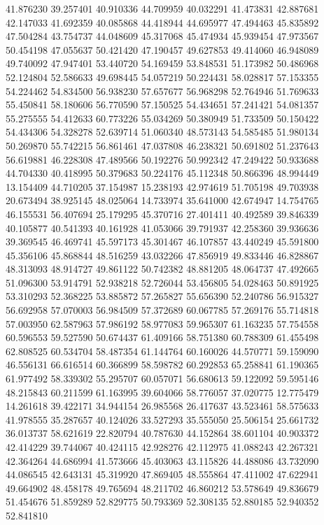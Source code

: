 41.876230
39.257401
40.910336
44.709959
40.032291
41.473831
42.887681
42.147033
41.692359
40.085868
44.418944
44.695977
47.494463
45.835892
47.504284
43.754737
44.048609
45.317068
45.474934
45.939454
47.973567
50.454198
47.055637
50.421420
47.190457
49.627853
49.414060
46.948089
49.740092
47.947401
53.440720
54.169459
53.848531
51.173982
50.486968
52.124804
52.586633
49.698445
54.057219
50.224431
58.028817
57.153355
54.224462
54.834500
56.938230
57.657677
56.968298
52.764946
51.769633
55.450841
58.180606
56.770590
57.150525
54.434651
57.241421
54.081357
55.275555
54.412633
60.773226
55.034269
50.380949
51.733509
50.150422
54.434306
54.328278
52.639714
51.060340
48.573143
54.585485
51.980134
50.269870
55.742215
56.861461
47.037808
46.238321
50.691802
51.237643
56.619881
46.228308
47.489566
50.192276
50.992342
47.249422
50.933688
44.704330
40.418995
50.379683
50.224176
45.112348
50.866396
48.994449
13.154409
44.710205
37.154987
15.238193
42.974619
51.705198
49.703938
20.673494
38.925145
48.025064
14.733974
35.641000
42.674947
14.754765
46.155531
56.407694
25.179295
45.370716
27.401411
40.492589
39.846339
40.105877
40.541393
40.161928
41.053066
39.791937
42.258360
39.936636
39.369545
46.469741
45.597173
45.301467
46.107857
43.440249
45.591800
45.356106
45.868844
48.516259
43.032266
47.856919
49.833446
46.828867
48.313093
48.914727
49.861122
50.742382
48.881205
48.064737
47.492665
51.096300
53.914791
52.938218
52.726044
53.456805
54.028463
50.891925
53.310293
52.368225
53.885872
57.265827
55.656390
52.240786
56.915327
56.692958
57.070003
56.984509
57.372689
60.067785
57.269176
55.714818
57.003950
62.587963
57.986192
58.977083
59.965307
61.163235
57.754558
60.596553
59.527590
50.674437
61.409166
58.751380
60.788309
61.455498
62.808525
60.534704
58.487354
61.144764
60.160026
44.570771
59.159090
46.556131
66.616514
60.366899
58.598782
60.292853
65.258841
61.190365
61.977492
58.339302
55.295707
60.057071
56.680613
59.122092
59.595146
48.215843
60.211599
61.163995
39.604066
58.776057
37.020775
12.775479
14.261618
39.422171
34.944154
26.985568
26.417637
43.523461
58.575633
41.978555
35.287657
40.124026
33.527293
35.555050
25.506154
25.661732
36.013737
58.621619
22.820794
40.787630
44.152864
38.601104
40.903372
42.414229
39.744067
40.424115
42.928276
42.112975
41.088243
42.267321
42.364264
44.686994
41.573666
45.403063
43.115826
44.488086
43.732090
44.086545
42.643131
45.319920
47.869405
48.555864
47.411002
47.622941
49.664902
48.458178
49.765694
48.211702
46.860212
53.578649
49.836679
51.454676
51.859289
52.829775
50.793369
52.308135
52.880185
52.940352
52.841810
